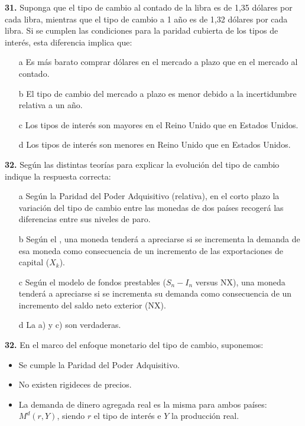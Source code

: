 \documentclass{nuevotema}
\begin{document}
\textbf{31.} Suponga que el tipo de cambio al contado de la libra es de 1,35 dólares por cada libra, mientras que el tipo de cambio a 1 año es de 1,32 dólares por cada libra. Si se cumplen las condiciones para la paridad cubierta de los tipos de interés, esta diferencia implica que:

\begin{itemize}
	\item[a] Es más barato comprar dólares en el mercado a plazo que en el mercado al contado.
	\item[b] El tipo de cambio del mercado a plazo es menor debido a la incertidumbre relativa a un año.
	\item[c] Los tipos de interés son mayores en el Reino Unido que en Estados Unidos.
	\item[d] Los tipos de interés son menores en Reino Unido que en Estados Unidos.
\end{itemize}


\textbf{32.} Según las distintas teorías para explicar la evolución del tipo de cambio indique la respuesta correcta:

\begin{enumerate}
	\item[a] Según la Paridad del Poder Adquisitivo (relativa), en el corto plazo la variación del tipo de cambio entre las monedas de dos países recogerá las diferencias entre sus niveles de paro.
	\item[b] Según el , una moneda tenderá a apreciarse si se incrementa la demanda de esa moneda como consecuencia de un incremento de las exportaciones de capital ($X_k$).
	\item[c] Según el modelo de fondos prestables ($S_n - I_n$ versus NX), una moneda tenderá a apreciarse si se incrementa su demanda como consecuencia de un incremento del saldo neto exterior (NX).
	\item[d] La a) y c) son verdaderas.
\end{enumerate}


\textbf{32.} En el marco del enfoque monetario del tipo de cambio, suponemos:

\begin{itemize}
	\item Se cumple la Paridad del Poder Adquisitivo.
	\item No existen rigideces de precios.
	\item La demanda de dinero agregada real es la misma para ambos países: $M^d (r, Y)$, siendo $r$ el tipo de interés e $Y$ la producción real.
\end{itemize}
\end{document}
